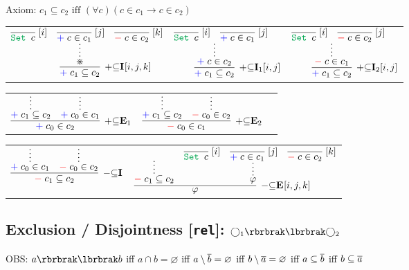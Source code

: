 \documentclass[11pt]{article}
\begin{document}
Axiom: $c_1 \subseteq c_2\text{ iff }(\forall c)(c\in c_1\rightarrow c\in c_2)$
\smallskip

\noindent
\begin{tabular}{ccc}
$
\infer[\AssertRule{\subseteq}\Intro{}{[i,j,k]}]{\Assert{c_1\subseteq c_2}}{
	\infer*{\divideontimes}{
		\infer[\Label{i}]{\Set{c}}{} 
		& 
		\infer[\Label{j}]{\Assert{c\in c_1}}{}
		& 
		\infer[\Label{k}]{\Deny{c\in c_2}}{}
	}
}
$
\hspace{1cm}
&
$
\infer[\AssertRule{\subseteq}\Intro{1}{[i,j]}]{\Assert{c_1\subseteq c_2}}{
	\infer*{\Assert{c\in c_2}}{
		\infer[\Label{i}]{\Set{c}}{} 
		& 
		\infer[\Label{j}]{\Assert{c\in c_1}}{}
	}
}
$
\hspace{1cm}
&
$
\infer[\AssertRule{\subseteq}\Intro{2}{[i,j]}]{\Assert{c_1\subseteq c_2}}{
	\infer*{\Deny{c\in c_1}}{
		\infer[\Label{i}]{\Set{c}}{} 
		& 
		\infer[\Label{j}]{\Deny{c\in c_2}}{}
	}
}
$
\end{tabular}
\bigskip

\noindent
\begin{tabular}{ccc}
$
\infer[\AssertRule{\subseteq}\Elim{1}]{\Assert{c_0\in c_2}}{
	\infer*{\Assert{c_1\subseteq c_2}}{} 
	& 
	\infer*{\Assert{c_0\in c_1}}{}
}
$
\hspace{1cm}
&
$
\infer[\AssertRule{\subseteq}\Elim{2}]{\Deny{c_0\in c_1}}{
	\infer*{\Assert{c_1\subseteq c_2}}{} 
	& 
	\infer*{\Deny{c_0\in c_2}}{}
}
$
\end{tabular}
\bigskip

\noindent
\begin{tabular}{cc}
$
\infer[\DenyRule{\subseteq}\Intro{}]{\Deny{c_1\subseteq c_2}}{
	\infer*{\Assert{c_0\in c_1}}{}
	&
	\infer*{\Deny{c_0\in c_2}}{}
}
$
\hspace{1cm}
&
$
\infer[\DenyRule{\subseteq}\Elim{}{[i,j,k]}]{\varphi}{
	\infer*{\Deny{c_1\subseteq c_2}}{}
	&
	\infer*{\varphi}{
		\infer[\Label{i}]{\Set{c}}{}
		&
		\infer[\Label{j}]{\Assert{c\in c_1}}{}
		&
		\infer[\Label{k}]{\Deny{c\in c_2}}{}
	}
}
$
\end{tabular}
\bigskip


\subsection*{Exclusion / Disjointness [\texttt{rel}]: $\bigcirc_1\Disjoint\bigcirc_2$}
\hfill OBS: $a\Disjoint b$ iff $a\cap b=\varnothing$ iff $a\setminus\overline{b}=\varnothing$ iff $b\setminus\overline{a}=\varnothing$ iff $a\subseteq \overline{b}$ iff $b\subseteq \overline{a}$
\bigskip
\end{document}
